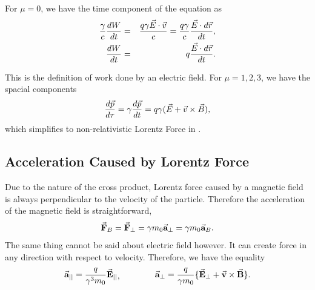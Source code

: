 \documentclass[a4paper,oneside,12pt]{report}
\numberwithin{equation}{chapter}
\begin{document}
For $ \mu = 0 $, we have the time component of the equation as
\vspace{-12pt}
\begin{eqnarray}
    \frac{\gamma}{c}\frac{d W}{d t} &=& \frac{q \gamma \vec{E}\cdot \vec{v}}{c} = \frac{q \gamma}{c}  \frac{\vec{E}  \cdot d \vec{r}}{d t}   ,\\
    \frac{d W}{d t} &=& q \frac{\vec{E}\cdot d \vec{r}} {d t} .
\end{eqnarray}

\vspace{-33pt}
\noindent
This is the definition of work done by an electric field. For $ \mu = 1,2,3 $, we have the spacial components
\vspace{-11pt}
\begin{equation}
    \frac{d \vecthree{p}}{d \tau} = \gamma \frac{d \vecthree{p}}{d t} = q \gamma (\vecthree{E} + \vecthree{v} \times \vecthree{B}) ,
    \vspace{-11pt}
\end{equation}
which simplifies to non-relativistic Lorentz Force in .


\subsection{Acceleration Caused by Lorentz Force}
Due to the nature of the cross product, Lorentz force caused by a magnetic field is always perpendicular to the velocity of the particle. 
Therefore the acceleration of the magnetic field is straightforward,
\vspace{-10pt}
\begin{equation}
    \vecthreeBF{F}_B = \vecthreeBF{F}_{\perp} = \gamma  m_0\vecthreeBF{a}_{\perp} = \gamma  m_0\vecthreeBF{a}_{B} .
    \vspace{-20pt}
\end{equation}
The same thing cannot be said about electric field however. 
It can create force in any direction with respect to velocity. Therefore, we have the equality
\vspace{-15pt}
\begin{equation} \label{eq:para_and_perp_acc_of_lorentz_force}
    \begin{aligned}
        \vecthreeBF{a}_{||} = \frac{q }{\gamma^3 m_0} \vecthreeBF{E}_{||}
    \end{aligned}  ,
    \qquad \qquad
    \begin{aligned}
        \vecthreeBF{a}_{\perp} = \frac{q}{\gamma m_0} \{ \vecthreeBF{E}_{\perp} + \crossProdBF{v}{B}   \} .
    \end{aligned}    
    \vspace{-10pt}
\end{equation}
\end{document}
